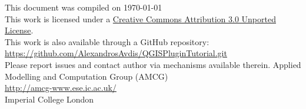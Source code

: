 \documentclass[11pt,a4paper,twoside,openany]{article}
\begin{document}
\thispagestyle{empty}
\begin{center}
This document was compiled on \today\\[30pt]
This work is licensed under a \href{http://creativecommons.org/licenses/by/3.0/deed.en_GB}{Creative Commons Attribution 3.0 Unported License}.\\[30pt]
This work is also available through a GitHub repository: \url{https://github.com/AlexandrosAvdis/QGISPluginTutorial.git}\\Please report issues and contact author via mechanisms available therein.
\vfill
{\footnotesize
Applied Modelling and Computation Group (AMCG)\\[10pt]
\url{http://amcg-www.ese.ic.ac.uk/}\\
Imperial College London}
\end{center}
\pagebreak

\setlength{\textwidth}{390pt}
\setlength{\textheight}{592pt}
\setlength{\topmargin}{-0.5in}
\setlength{\headsep}{10mm}
\setlength{\textheight}{240mm}
\setlength{\oddsidemargin}{4mm}
\setlength{\evensidemargin}{-4.mm}



%

\begin{appendices}

\end{appendices}



\end{document}

